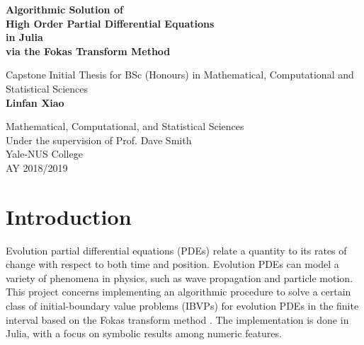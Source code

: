 \documentclass[11pt, oneside, a4paper]{article}
\begin{document}
\begin{titlepage}
\begin{center}
\vspace{1cm}
\huge
\textbf{Algorithmic Solution of\\ High Order Partial Differential Equations\\
in Julia\\ via the Fokas Transform Method}

\LARGE
\vspace{.5cm}
Capstone Initial Thesis for BSc (Honours) in
Mathematical, Computational and Statistical Sciences\\
\vspace{.5cm}
\textbf{Linfan Xiao}\\
\vspace{.5cm}
\Large
\vspace{.5cm}
\Large
\end{center}

\vfill
\Large
\begin{center}	
Mathematical, Computational, and Statistical Sciences\\
Under the supervision of Prof. Dave Smith\\
Yale-NUS College\\
AY 2018/2019\\
\end{center}
\end{titlepage}
\tableofcontents
\pagebreak
{}

\pagebreak
{}

\section{Introduction}\label{sec:intro}
Evolution partial differential equations (PDEs) relate a quantity to its rates of change with respect to both time and position. Evolution PDEs can model a variety of phenomena in physics, such as wave propagation and particle motion. This project concerns implementing an algorithmic procedure to solve a certain class of initial-boundary value problems (IBVPs) for evolution PDEs in the finite interval \cite{Smith2016} based on the Fokas transform method \cite{Fokas2008}. The implementation is done in Julia, with a focus on symbolic results among numeric features.
\end{document}
